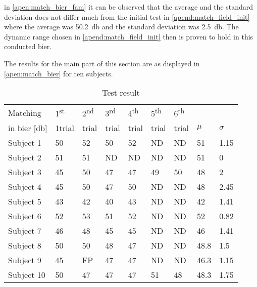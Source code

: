 in \autoref{apen:match_bier_fam}  it can be observed that the average and the standard deviation does not differ much from the initial test in \autoref{apend:match_field_init} where the average was \SI{50.2}{\decibel} and the standard deviation was \SI{2.5}{\decibel}. The dynamic range chosen in  \autoref{apend:match_field_init} then is proven to hold in this conducted \gls{bier}.


The results for the main part of this section are as displayed in \autoref{apen:match_bier} for ten subjects. 
\begin{table}[H]
\centering
\caption{Test result}
\begin{tabular}{lllllllll}
\multicolumn{1}{l|}{Matching }   & 1\textsuperscript{st}  & 2\textsuperscript{nd}  & 3\textsuperscript{rd}  & 4\textsuperscript{th} & 5\textsuperscript{th}  & \multicolumn{1}{l|}{6\textsuperscript{th} }                &    &  \\
\multicolumn{1}{l|}{in \gls{bier} [\si{\decibel}] }   & 1trial & trial &  trial &  trial &  trial & \multicolumn{1}{l|}{trial}                & $\mu$   & $\sigma$ \\ \hline
\multicolumn{1}{l|}{Subject 1}  & 50    & 52    & 50    & 52    & ND    & \multicolumn{1}{l|}{ND} & 51   & 1.15  \\
\multicolumn{1}{l|}{Subject 2}  & 51    & 51    & ND    & ND    & ND    & \multicolumn{1}{l|}{ND} & 51   & 0     \\
\multicolumn{1}{l|}{Subject 3}  & 45    & 50    & 47    & 47    & 49    & \multicolumn{1}{l|}{50} & 48   & 2     \\
\multicolumn{1}{l|}{Subject 4}  & 45    & 50    & 47    & 50    & ND    & \multicolumn{1}{l|}{ND} & 48   & 2.45  \\
\multicolumn{1}{l|}{Subject 5}  & 43    & 42    & 40    & 43    & ND    & \multicolumn{1}{l|}{ND} & 42   & 1.41  \\
\multicolumn{1}{l|}{Subject 6}  & 52    & 53    & 51    & 52    & ND    & \multicolumn{1}{l|}{ND} & 52   & 0.82  \\
\multicolumn{1}{l|}{Subject 7}  & 46    & 48    & 45    & 45    & ND    & \multicolumn{1}{l|}{ND} & 46   & 1.41  \\
\multicolumn{1}{l|}{Subject 8}  & 50    & 50    & 48    & 47    & ND    & \multicolumn{1}{l|}{ND} & 48.8 & 1.5   \\
\multicolumn{1}{l|}{Subject 9}  & 45    & FP    & 47    & 47    & ND    & \multicolumn{1}{l|}{ND} & 46.3 & 1.15  \\
\multicolumn{1}{l|}{Subject 10} & 50    & 47    & 47    & 47    & 51    & \multicolumn{1}{l|}{48} & 48.3 & 1.75 
\end{tabular}
\label{apen:match_bier} 
\end{table}

